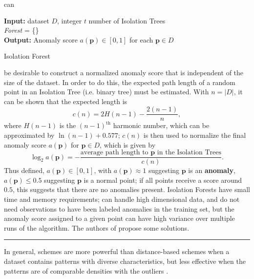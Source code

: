 can 
\begin{algorithm}[h]
\SetAlgoLined
\textbf{Input:} dataset $D$, integer $t$ number of Isolation Trees %
\\\textit{Forest} = \{\}
\\
\For{$\mathbf{p} \in D$}{
$\textit{PathLengths} = \{\}$
\\\For{\textit{Tree} in \textit{Forest}}{
Find the path length $\ell$ from the root of Tree to node $\{\mathbf{p}\}$
\\Add $\ell$ to $\textit{PathLengths}$
}
$\textit{AveragePathLength} = \frac{\sum_{\ell \in \textit{PathLengths}} \ell}{t}$
\\Set $a(\mathbf{p}) = 2^{- \frac{\textit{AveragePathLength}}{c(|D|)}} $
}
\textbf{Output:} Anomaly score $a(\mathbf{p}) \in [0,1]$ for each $\mathbf{p} \in D$
\caption{Isolation Forest}
\label{iForest}
\end{algorithm}
be desirable to construct a normalized anomaly score that is independent of the size of the dataset.
In order to do this, the expected path length of a random point in an Isolation Tree (i.e. binary tree) must be estimated. With $n = |D|$, it can be shown that the expected length is 
$$
c(n) 
= 2 H(n-1) - \frac{2(n-1)}{n},
$$
where $H(n-1)$ is the $(n-1)^{\text{th}}$ harmonic number, which can be approximated by $\ln(n-1) + 0.577$;
$c(n)$ is then used to normalize the final anomaly score $a(\mathbf{p})$ for $\mathbf{p} \in D$, which is given by
$$
\log_2 a(\mathbf{p})
= -\frac{\text{average path length to $\mathbf{p}$ in the Isolation Trees}}{c(n)}.
$$
Thus defined, $a(\mathbf{p})\in [0,1]$, with $a(\mathbf{p}) \approx 1$ suggesting $\mathbf{p}$ is an \textbf{anomaly}, $a(\mathbf{p}) \leq 0.5$ suggesting $\mathbf{p}$ is a normal point;
if all points receive a score around $0.5$, this suggests that there are no anomalies present.
\newl Isolation Forests have small time and memory requirements; can handle high dimensional data, and do not need observations to have been labeled anomalies in the training set, but the anomaly score assigned to a given point can have high variance over multiple runs of the algorithm. The authors of \cite{EIF} propose some solutions.
\begin{center}\rule{0.5\linewidth}{.4pt}\end{center}
In general,  schemes are more powerful than distance-based schemes when a dataset contains patterns with diverse characteristics, but less effective when the patterns are of comparable densities with the outliers \cite{JZ}.

